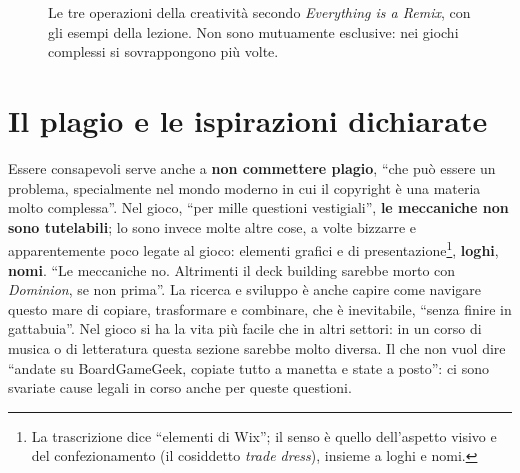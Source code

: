 \begin{figure}[htbp]
\centering
{}
\caption{Le tre operazioni della creatività secondo \emph{Everything is a Remix}, con
gli esempi della lezione. Non sono mutuamente esclusive: nei giochi complessi si
sovrappongono più volte.}
\label{a6:fig:remix}
\end{figure}

\section{Il plagio e le ispirazioni dichiarate}
\label{a6:sec:plagio}

Essere consapevoli serve anche a \textbf{non commettere plagio}, ``che può essere un
problema, specialmente nel mondo moderno in cui il copyright è una materia molto
complessa''. Nel gioco, ``per mille questioni vestigiali'', \textbf{le meccaniche non
sono tutelabili}; lo sono invece molte altre cose, a volte bizzarre e apparentemente
poco legate al gioco: elementi grafici e di presentazione\footnote{La trascrizione
dice ``elementi di Wix''; il senso è quello dell'aspetto visivo e del confezionamento
(il cosiddetto \emph{trade dress}), insieme a loghi e nomi.}, \textbf{loghi},
\textbf{nomi}. ``Le meccaniche no. Altrimenti il deck building sarebbe morto con
\emph{Dominion}, se non prima''. La ricerca e sviluppo è anche capire come navigare
questo mare di copiare, trasformare e combinare, che è inevitabile, ``senza finire in
gattabuia''. Nel gioco si ha la vita più facile che in altri settori: in un corso di
musica o di letteratura questa sezione sarebbe molto diversa. Il che non vuol dire
``andate su BoardGameGeek, copiate tutto a manetta e state a posto'': ci sono
svariate cause legali in corso anche per queste questioni.

